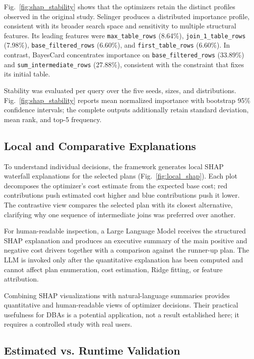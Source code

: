 \documentclass[conference]{IEEEtran}
\begin{document}
Fig.~\ref{fig:shap_stability} shows that the optimizers retain the distinct profiles observed in the original study. Selinger produces a distributed importance profile, consistent with its broader search space and sensitivity to multiple structural features. Its leading features were \texttt{max\_table\_rows} (8.64\%), \texttt{join\_1\_table\_rows} (7.98\%), \texttt{base\_filtered\_rows} (6.60\%), and \texttt{first\_table\_rows} (6.60\%). In contrast, BayesCard concentrates importance on \texttt{base\_filtered\_rows} (33.89\%) and \texttt{sum\_intermediate\_rows} (27.88\%), consistent with the constraint that fixes its initial table.

Stability was evaluated per query over the five seeds, sizes, and distributions. Fig.~\ref{fig:shap_stability} reports mean normalized importance with bootstrap 95\% confidence intervals; the complete outputs additionally retain standard deviation, mean rank, and top-5 frequency.

\subsection{Local and Comparative Explanations}

To understand individual decisions, the framework generates local SHAP waterfall explanations for the selected plans (Fig.~\ref{fig:local_shap}). Each plot decomposes the optimizer's cost estimate from the expected base cost; red contributions push estimated cost higher and blue contributions push it lower. The contrastive view compares the selected plan with its closest alternative, clarifying why one sequence of intermediate joins was preferred over another.

For human-readable inspection, a Large Language Model receives the structured SHAP explanation and produces an executive summary of the main positive and negative cost drivers together with a comparison against the runner-up plan. The LLM is invoked only after the quantitative explanation has been computed and cannot affect plan enumeration, cost estimation, Ridge fitting, or feature attribution.

Combining SHAP visualizations with natural-language summaries provides quantitative and human-readable views of optimizer decisions. Their practical usefulness for DBAs is a potential application, not a result established here; it requires a controlled study with real users.


\subsection{Estimated vs. Runtime Validation}
\end{document}
